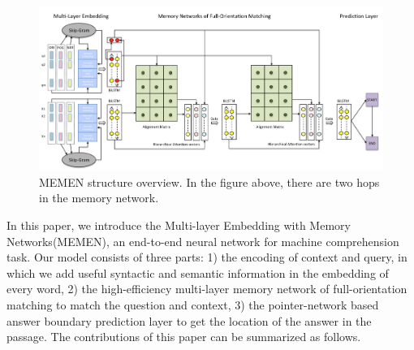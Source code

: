 \documentclass[letterpaper]{article}
\begin{document}
\begin{figure}[htbp]
  \begin{center}
  \includegraphics[width=1 \textwidth]{draft2.jpg}
  \caption{MEMEN structure overview. In the figure above, there are two hops in the memory network.}
  \end{center}
\end{figure}

In this paper, we introduce the Multi-layer Embedding with Memory Networks(MEMEN), an end-to-end neural network for machine comprehension task. Our model consists of three parts: 1) the encoding of context and query, in which we add useful syntactic  and semantic information in the embedding of every word, 2) the high-efficiency multi-layer memory network of full-orientation matching to match the question and context, 3) the pointer-network based answer boundary prediction layer to get the location of the answer in the passage. The contributions of this paper can be summarized as follows.
\end{document}
